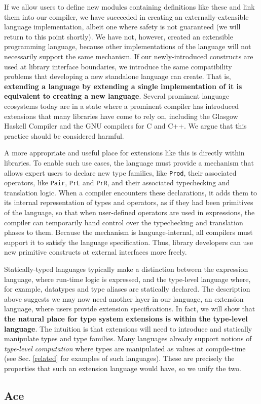 If we allow users to define new modules containing definitions like these and link them into our compiler, we have succeeded in creating an externally-extensible language implementation, albeit one where safety is not guaranteed (we will return to this point shortly). We have not, however, created an extensible programming language, because other implementations of the language will not necessarily support the same mechanism. 
If our newly-introduced constructs are used at library interface boundaries, we introduce the same compatibility problems that developing a new standalone language can create. That is, \textbf{extending a language by extending a single implementation of it is equivalent to creating a new language}. Several prominent language ecosystems today are in a state where a prominent compiler has introduced extensions that many libraries have come to rely on, including the Glasgow Haskell Compiler and the GNU compilers for C and C++. We argue that this practice should be considered harmful.

A more appropriate and useful place for extensions like this is directly within libraries. To enable such use cases, the language must provide a mechanism that allows expert users to declare new type families, like \lstinline{Prod}, their associated operators, like \lstinline{Pair}, \lstinline{PrL} and \lstinline{PrR}, and their associated typechecking and translation logic. When a compiler encounters these declarations, it adds them to its internal representation of types and operators, as if they had been primitives of the language, so that when user-defined operators are used in expressions, the compiler can temporarily hand control over the typechecking and translation phases to them. Because the mechanism is {language-internal}, all compilers must support it to satisfy the language specification. Thus, library developers can use new primitive constructs at external interfaces more freely.

Statically-typed languages typically make a distinction between the expression language, where run-time logic is expressed, and the type-level language where, for example, datatypes and type aliases are statically declared. The description above suggests we may now need another layer in our language, an {extension language}, where users provide extension specifications. In fact, we will show that \textbf{the natural place for type system extensions is within the type-level language}. The intuition is that extensions will need to introduce and statically manipulate types and type families. Many languages already support notions of \emph{type-level computation} where types are manipulated as values at compile-time (see Sec. \ref{related} for examples of such languages). These are precisely the properties that such an extension language would have, so we unify the two.


\subsection{Ace}\label{ace}